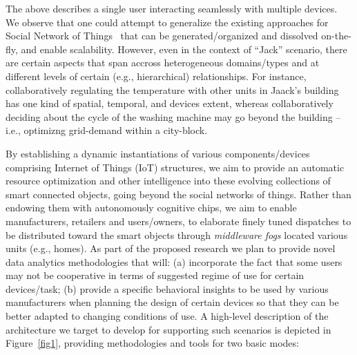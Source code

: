 The above describes a single user interacting seamlessly with multiple devices. We observe that one could attempt to generalize the existing approaches for Social Network of Things~\cite{IeraMA15,NittiPCA16} that can be generated/organized and dissolved on-the-fly, and enable scalability.
However, even in the context of ``Jack'' scenario, there are certain aspects that span accross heterogeneous domains/types and at different levels of certain (e.g., hierarchical) relationships. For instance, collaboratively regulating the temperature with other units in Jaack’s building has one kind of spatial, temporal, and devices extent, whereas collaboratively deciding about the cycle of the washing machine may go beyond the building -- i.e., optimizng grid-demand within a city-block.

By establishing a dynamic instantiations of various components/devices comprising Internet of Things (IoT) structures, we aim to  provide an automatic resource optimization and other intelligence into these evolving collections of smart connected objects, going beyond the social networks of things. Rather than endowing them with autonomously cognitive chips, we aim to enable manufacturers, retailers and users/owners, to elaborate finely tuned dispatches to be distributed toward the smart objects through {\it middleware fogs} located various units (e.g., homes).
As part of the proposed research we plan to provide novel data analytics methodologies that will: (a) incorporate the fact that some users may not be cooperative in terms of suggested regime of use for certain devices/task; (b) provide a specific behavioral insights to be used by various manufacturers when planning the design of certain devices so that they can be better adapted to changing conditions of use.
 A high-level description of the architecture we target to develop for supporting such  scenarios is depicted in Figure~\ref{fig1}, providing methodologies and tools for two basic modes: \\

